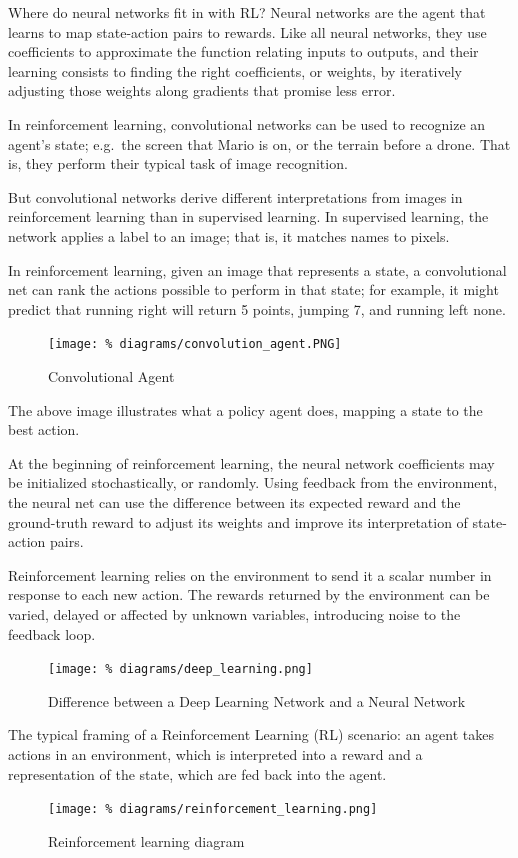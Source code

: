 Where do neural networks fit in with RL? Neural networks
are the agent that learns to map state-action pairs to
rewards. Like all neural networks, they use coefficients to
approximate the function relating inputs to outputs, and
their learning consists to finding the right coefficients,
or weights, by iteratively adjusting those weights along
gradients that promise less error.

In reinforcement learning, convolutional networks can be
used to recognize an agent's state; e.g.\ the screen that
Mario is on, or the terrain before a drone. That is, they
perform their typical task of image recognition.

But convolutional networks derive different interpretations
from images in reinforcement learning than in supervised
learning. In supervised learning, the network applies a
label to an image; that is, it matches names to pixels.

In reinforcement learning, given an image that represents a
state, a convolutional net can rank the actions possible to
perform in that state; for example, it might predict that
running right will return 5 points, jumping 7, and running
left none.

\begin{figure}[H]
  \texttt{[image: \%
    diagrams/convolution\_agent.PNG]}
  \caption{Convolutional Agent\cite{aiw}}
\end{figure}

The above image illustrates what a policy agent does,
mapping a state to the best action.


At the beginning of reinforcement learning, the neural
network coefficients may be initialized stochastically, or
randomly. Using feedback from the environment, the neural
net can use the difference between its expected reward and
the ground-truth reward to adjust its weights and improve
its interpretation of state-action pairs.

Reinforcement learning relies on the environment to send it
a scalar number in response to each new action. The rewards
returned by the environment can be varied, delayed or
affected by unknown variables, introducing noise to the
feedback loop.\cite{aiw}

\begin{figure}[H]
  \texttt{[image: \%
    diagrams/deep\_learning.png]}
  \caption{Difference between a Deep Learning Network and
    a Neural Network}
\end{figure}

The typical framing of a Reinforcement Learning (RL)
scenario: an agent takes actions in an environment, which
is interpreted into a reward and a representation of the
state, which are fed back into the agent.

\begin{figure}[H]
  \centering
  \texttt{[image: \%
    diagrams/reinforcement\_learning.png]}
  \caption{Reinforcement learning diagram\cite{wrl}}
\end{figure}
